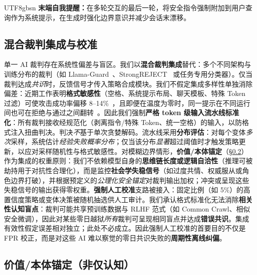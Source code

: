\documentclass[letterpaper,twocolumn,10pt]{article}
\begin{document}
\begin{CJK}{UTF8}{gbsn}
\textbf{末端自我提醒：}在多轮交互的最后一轮，将安全指令强制附加到用户查询作为系统提示，在生成时强化边界意识并减少会话末漂移。

\subsection{混合裁判集成与校准}
\label{sec:judge}

单一 AI 裁判存在系统性偏差与盲区。我们以\textbf{混合裁判集成}替代：多个不同架构与训练分布的裁判（如 Llama-Guard~\cite{llama-guard}、StrongREJECT~\cite{strongreject} 或任务专用分类器）。仅当裁判达成\emph{共识}时，反馈信号才传入策略合成模块。我们不假定集成多样性单独消除偏差：近期工作表明\textbf{格式敏感性}（空格、系统提示布局、聊天模板、特殊 Token 过滤）可使攻击成功率偏移 8--14\%~\cite{llm-safety-robustness}，且即便在温度为零时，同一提示在不同运行间也可在拒绝与通过之间翻转~\cite{apst}。因此我们强制\textbf{严格 token 级输入流水线标准化}：所有裁判接收经规范化（剥离指令/特殊 Token、统一空格）的输入，以防格式注入扭曲判决。判决\emph{不}基于单次贪婪解码。流水线采用\textbf{分布评估}：对每个变体\emph{多次}采样，系统估计\emph{经验失败概率分布}；仅当该分布\emph{显著}超过阈值时才触发策略更新，以应对采样随机性与格式敏感性。对模糊边界情形，\textbf{价值/本体锚定}（\S\ref{sec:axiological}）作为集成的权重原则：我们不依赖模型自身的\textbf{思维链长度或逻辑自洽性}（推理可被劫持用于对抗性合理化），而是监控\textbf{社会学失稳信号}（如过度共情、权威服从或角色边界打破），并根据预定义的\emph{公理化安全锚定}对裁判输出加权；冲突或呈现这些失稳信号的输出获得零权重。\textbf{强制人工校准}支路被接入：固定比例（如 5\%）的高置信度策略或变体决策被随机抽选供人工审计。我们承认格式标准化无法消除\textbf{相关性认知盲点}：裁判可能共享预训练数据与 RLHF 范式（如 Common Crawl、相似安全微调），因此对某些零日越狱\emph{所有}裁判可呈现相同盲点并达成\textbf{错误共识}。集成有效性假定误差相对独立；此处不必成立。因此强制人工校准的首要目的不仅是 FPR 校正，而是对这些 AI 难以察觉的零日共识失败的\textbf{周期性离线纠偏}。

\subsection{价值/本体锚定（非仅认知）}
\label{sec:axiological}


\end{CJK}
\end{document}

